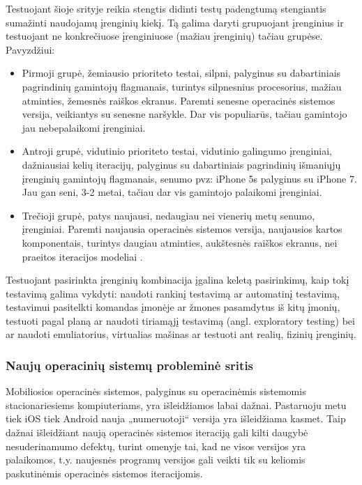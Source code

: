 \documentclass{VUMIFPSkursinis}
\begin{document}
Testuojant šioje srityje reikia stengtis didinti testų padengtumą stengiantis sumažinti naudojamų įrenginių kiekį. Tą galima daryti grupuojant įrenginius ir testuojant ne konkrečiuose įrenginiuose (mažiau įrenginių) tačiau grupėse. Pavyzdžiui:

\begin{itemize}
   \item Pirmoji grupė, žemiausio prioriteto testai, silpni, palyginus su dabartiniais pagrindinių gamintojų flagmanais, turintys silpnesnius procesorius, mažiau atminties, žemesnės raiškos ekranus. Paremti senesne operacinės sistemos versija, veikiantys su senesne naršykle. Dar vis populiarūs, tačiau gamintojo jau nebepalaikomi įrenginiai.

   \item Antroji grupė, vidutinio prioriteto testai, vidutinio galingumo įrenginiai, dažniausiai kelių iteracijų, palyginus su dabartiniais pagrindinių išmaniųjų įrenginių gamintojų flagmanais, senumo pvz: iPhone 5s palyginus su iPhone 7. Jau gan seni, 3-2 metai, tačiau dar vis gamintojo palaikomi įrenginiai.

   \item Trečioji grupė, patys naujausi, nedaugiau nei vienerių metų senumo, įrenginiai. Paremti naujausia operacinės sistemos versija, naujausios kartos komponentais, turintys daugiau atminties, aukštesnės raiškos ekranus, nei praeitos iteracijos modeliai \cite{6496451}.
\end{itemize}
\bigskip
Testuojant pasirinkta įrenginių kombinacija įgalina keletą pasirinkimų, kaip tokį testavimą galima vykdyti: naudoti rankinį testavimą ar automatinį testavimą, testavimui pasitelkti komandas įmonėje ar žmones pasamdytus iš kitų įmonių, testuoti pagal planą ar naudoti tiriamąjį testavimą (angl. exploratory testing) bei ar naudoti emuliatorius, virtualias mašinas ar testuoti ant realių, fizinių įrenginių.

\subsubsection{Naujų operacinių sistemų probleminė sritis}
Mobiliosios operacinės sistemos, palyginus su operacinėmis sistemomis stacionariesiems kompiuteriams, yra išleidžiamos labai dažnai. Pastaruoju metu tiek iOS tiek Android nauja „numeruotoji“ versija yra išleidžiama kasmet. Taip dažnai išleidžiant naują operacinės sistemos iteraciją gali kilti daugybė nesuderinamumo defektų, turint omenyje tai, kad ne visos versijos yra palaikomos, t.y. naujesnės programų versijos gali veikti tik su keliomis paskutinėmis operacinės sistemos iteracijomis.
\end{document}
